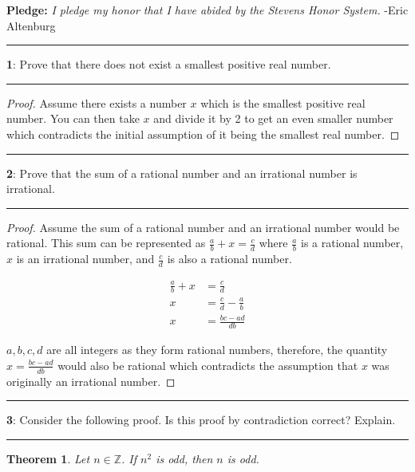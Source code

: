\documentclass[11pt]{article}
\newtheorem{theorem}{Theorem}
\newcommand\question[2]{\vspace{.25in}\hrule\textbf{#1}: #2\vspace{.5em}\hrule\vspace{.10in}}
\newcommand{\Z}{\mathbb{Z}}
\begin{document}
\raggedright
\newcommand\NAME{Eric Altenburg}  %
\newcommand\COURSE{MA-240}
\newcommand\HWNUM{4}              %


\textbf{Pledge:} \textit{I pledge my honor that I have abided by the Stevens Honor System.} -Eric Altenburg

\question{1}{Prove that there does not exist a smallest positive real number.}

\begin{proof}
	Assume there exists a number $x$ which is the smallest positive real number. You can then take $x$ and divide it by 2 to get an even smaller number which contradicts the initial assumption of it being the smallest real number.
\end{proof}


\question{2}{Prove that the sum of a rational number and an irrational number is irrational.}

\begin{proof}
	Assume the sum of a rational number and an irrational number would be rational. This sum can be represented as $\frac{a}{b} + x = \frac{c}{d}$ where $\frac{a}{b}$ is a rational number, $x$ is an irrational number, and $\frac{c}{d}$ is also a rational number.

	\begin{align*}
		\frac{a}{b} + x &= \frac{c}{d}\\
		x &= \frac{c}{d} - \frac{a}{b}\\
		x &= \frac{bc-ad}{db}
	\end{align*}

	$a, b, c, d$ are all integers as they form rational numbers, therefore, the quantity $x = \frac{bc-ad}{db}$ would also be rational which contradicts the assumption that $x$ was originally an irrational number.
\end{proof}

\question{3}{Consider the following proof. Is this proof by contradiction correct? Explain.}

\begin{theorem}
	Let $n \in \Z$. If $n^2$ is odd, then $n$ is odd.
\end{theorem}
\end{document}
